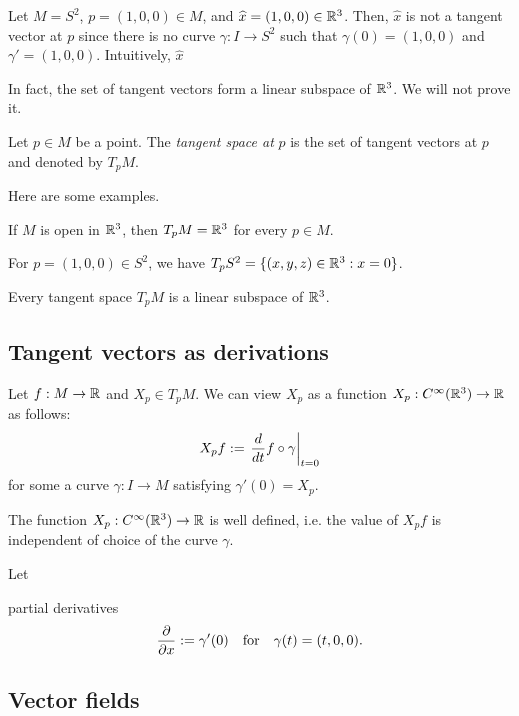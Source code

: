 \documentclass{../exp}
\begin{document}
\begin{ex}
Let $M=S^2$, $p=(1,0,0)\in M$, and $\widehat x=(1,0,0)\in\mathbb{R}^3$.
Then, $\hat x$ is not a tangent vector at $p$ since there is no curve $\gamma:I\to S^2$ such that $\gamma(0)=(1,0,0)$ and $\gamma'=(1,0,0)$.
Intuitively, $\hat x$ 
\end{ex}

In fact, the set of tangent vectors form a linear subspace of $\mathbb{R}^3$.
We will not prove it.

\begin{defn}
Let $p\in M$ be a point.
The \emph{tangent space at} $p$ is the set of tangent vectors at $p$ and denoted by $T_pM$.
\end{defn}
Here are some examples.
\begin{ex}
If $M$ is open in $\mathbb{R}^3$, then $T_pM=\mathbb{R}^3$ for every $p\in M$.
\end{ex}
\begin{ex}
For $p=(1,0,0)\in S^2$, we have $T_pS^2=\{(x,y,z)\in\mathbb{R}^3:x=0\}$.
\end{ex}
\begin{prop}
Every tangent space $T_pM$ is a linear subspace of $\mathbb{R}^3$.
\end{prop}


\subsection{Tangent vectors as derivations}

\begin{defn}
Let $f:M\to\R$ and $X_p\in T_pM$.
We can view $X_p$ as a function 
$X_p:C^\oo(\R^3)\to\R$ as follows:
\[X_pf:=\evalat{\dd{t}f\o\gamma}{t=0}\]
for some a curve $\gamma:I\to M$ satisfying $\gamma'(0)=X_p$.
\end{defn}
\begin{prop}
The function $X_p:C^\oo(\R^3)\to\R$ is well defined, i.e. the value of $X_pf$ is independent of choice of the curve $\gamma$.
\end{prop}

\begin{defn}[Derivation]
Let 
\end{defn}



partial derivatives
\[\pd{x}:=\gamma'(0)\quad\text{for}\quad \gamma(t)=(t,0,0).\]

\subsection{Vector fields}
\end{document}
